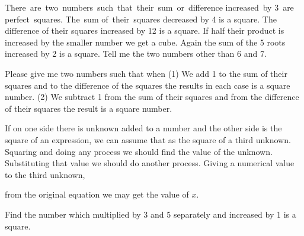 \documentclass[]{article}
\begin{document}
{There \,are \,two \,numbers \,such \,that \,their \,sum \,or \,difference increased \,by 3 \,are \,perfect \,squares. The \,sum of \,their \,squares decreased by 4 is a
square. The difference of their squares increased by 12 is a square. If
half their product is increased by the smaller number we get a cube.
Again the sum of the 5 roots increased by 2 is a square. Tell me the two
numbers other than 6 and 7.}

\begin{quote}  {
}  \end{quote}

{Please give me two numbers such that when (1) We add 1 to the sum of
their squares and to the difference of the squares the results in each
case is a square number. (2) We subtract 1 from the sum of their squares
and from the difference of their squares the result is a square number.}

\begin{quote}  {
}  \end{quote}

If on one side there is unknown added to a number and the other side is
the square of an expression, we can assume that as the square of a third
unknown. Squaring and doing any process we should find the value of the
unknown. Substituting that value we should do another process. Giving a
numerical value to the third unknown,
\newpage
\large

\noindent from the original equation we may get the value of $x$.

\begin{quote}  {
}  \end{quote}

{Find the number which multiplied by 3 and 5 separately and increased by
1 is a square.}
\end{document}
